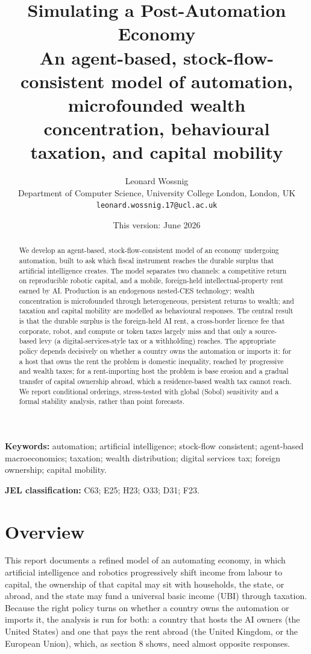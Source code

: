 \documentclass[11pt]{article}
\title{\textbf{Simulating a Post-Automation Economy}\\[4pt]
\large An agent-based, stock-flow-consistent model of automation, microfounded wealth concentration, behavioural taxation, and capital mobility}
\author{Leonard Wossnig \\ {\normalsize Department of Computer Science, University College London, London, UK} \\ {\normalsize \texttt{leonard.wossnig.17@ucl.ac.uk}}}
\date{This version: June 2026}
\begin{document}
\maketitle
\begin{abstract}
\noindent We develop an agent-based, stock-flow-consistent model of an economy undergoing automation, built to ask which fiscal instrument reaches the durable surplus that artificial intelligence creates. The model separates two channels: a competitive return on reproducible robotic capital, and a mobile, foreign-held intellectual-property rent earned by AI. Production is an endogenous nested-CES technology; wealth concentration is microfounded through heterogeneous, persistent returns to wealth; and taxation and capital mobility are modelled as behavioural responses. The central result is that the durable surplus is the foreign-held AI rent, a cross-border licence fee that corporate, robot, and compute or token taxes largely miss and that only a source-based levy (a digital-services-style tax or a withholding) reaches. The appropriate policy depends decisively on whether a country owns the automation or imports it: for a host that owns the rent the problem is domestic inequality, reached by progressive and wealth taxes; for a rent-importing host the problem is base erosion and a gradual transfer of capital ownership abroad, which a residence-based wealth tax cannot reach. We report conditional orderings, stress-tested with global (Sobol) sensitivity and a formal stability analysis, rather than point forecasts.
\end{abstract}

\vspace{0.3em}
\noindent\textbf{Keywords:} automation; artificial intelligence; stock-flow consistent; agent-based macroeconomics; taxation; wealth distribution; digital services tax; foreign ownership; capital mobility.

\vspace{0.2em}
\noindent\textbf{JEL classification:} C63; E25; H23; O33; D31; F23.
\vspace{0.6em}

\hypertarget{overview}{%
\section{Overview}\label{overview}}

This report documents a refined model of an automating economy, in which
artificial intelligence and robotics progressively shift income from
labour to capital, the ownership of that capital may sit with
households, the state, or abroad, and the state may fund a universal
basic income (UBI) through taxation. Because the right policy turns on
whether a country owns the automation or imports it, the analysis is run
for both: a country that hosts the AI owners (the United States) and one
that pays the rent abroad (the United Kingdom, or the European Union),
which, as section 8 shows, need almost opposite responses.
\end{document}
